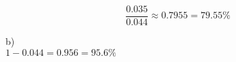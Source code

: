\documentclass[12pt]{scrartcl}
\begin{document}
\[\frac{0.035}{0.044} \approx 0.7955 = 79.55\%\]

b)\\
$1-0.044 = 0.956 = 95.6\%$





% 
\end{document}
